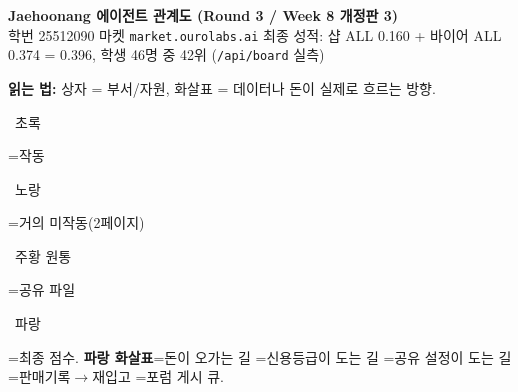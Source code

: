 \documentclass[landscape,11pt]{article}
\begin{document}
\begin{center}
{\Large\bfseries Jaehoonang 에이전트 관계도 (Round 3 / Week 8 개정판 3)}\\[1mm]
{\footnotesize 학번 25512090 \quad 마켓 \texttt{market.ourolabs.ai} \quad
최종 성적: 샵 ALL 0.160 + 바이어 ALL 0.374 = 0.396, 학생 46명 중 42위 (\texttt{/api/board} 실측)}
\end{center}

\vspace{1mm}
\noindent\footnotesize\textbf{읽는 법:} 상자 = 부서/자원, 화살표 = 데이터나 돈이 실제로 흐르는 방향. \colorbox{green!22}{\strut~초록~}=작동 \colorbox{yellow!40}{\strut~노랑~}=거의 미작동(2페이지) \colorbox{orange!18}{\strut~주황 원통~}=공유 파일 \colorbox{blue!18}{\strut~파랑~}=최종 점수.
{\color{blue}\textbf{파랑 화살표}}=돈이 오가는 길 =신용등급이 도는 길 =공유 설정이 도는 길 =판매기록$\to$재입고 =포럼 게시 큐.
\end{document}

